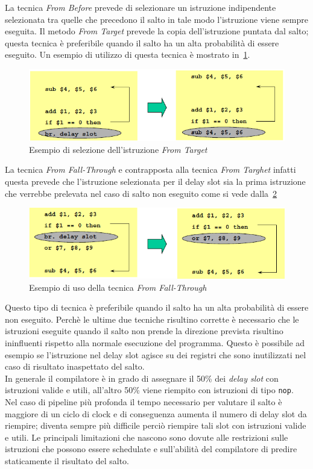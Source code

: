 La tecnica \emph{From Before} prevede di selezionare un istruzione indipendente selezionata tra quelle che precedono il salto in tale modo l'istruzione viene sempre eseguita. Il metodo \emph{From Target} prevede la copia dell'istruzione puntata dal salto; questa tecnica è preferibile quando il salto ha un alta probabilità di essere eseguito. Un esempio di utilizzo di questa tecnica è mostrato in \figurename\,\ref{fig:fromtarget}.
\begin{figure}[htb]
\centering
\includegraphics[scale=0.5]{img/fromtarget.png}
\caption{Esempio di selezione dell'istruzione \emph{From Target}}\label{fig:fromtarget}
\end{figure}
La tecnica \emph{From Fall-Through} e contrapposta alla tecnica \emph{From Targhet} infatti questa prevede che l'istruzione selezionata per il delay slot sia la prima istruzione che verrebbe prelevata nel caso di salto non eseguito come si vede dalla \figurename\,\ref{fig:fromfall}
\begin{figure}[htb]
\centering
\includegraphics[scale=0.5]{img/fromfall.png}
\caption{Esempio di uso della tecnica \emph{From Fall-Through}}\label{fig:fromfall}
\end{figure}
Questo tipo di tecnica è preferibile quando il salto ha un alta probabilità di essere non eseguito.
Perchè le ultime due tecniche risultino corrette è necessario che le istruzioni eseguite quando il salto non prende la direzione prevista risultino ininfluenti rispetto alla normale esecuzione del programma. Questo è possibile ad esempio se l'istruzione nel delay slot agisce su dei registri che sono inutilizzati nel caso di risultato inaspettato del salto.\\
In generale il compilatore è in grado di assegnare il 50\% dei \emph{delay slot} con istruzioni valide e utili, all'altro 50\% viene riempito con istruzioni di tipo \texttt{nop}. Nel caso di pipeline più profonda il tempo necessario per valutare il salto è maggiore di un ciclo di clock e di conseguenza aumenta il numero di delay slot da riempire; diventa sempre più difficile perciò riempire tali slot con istruzioni valide e utili. Le principali limitazioni che nascono sono dovute alle restrizioni sulle istruzioni che possono essere schedulate e sull'abilità del compilatore di predire staticamente il risultato del salto.\\

